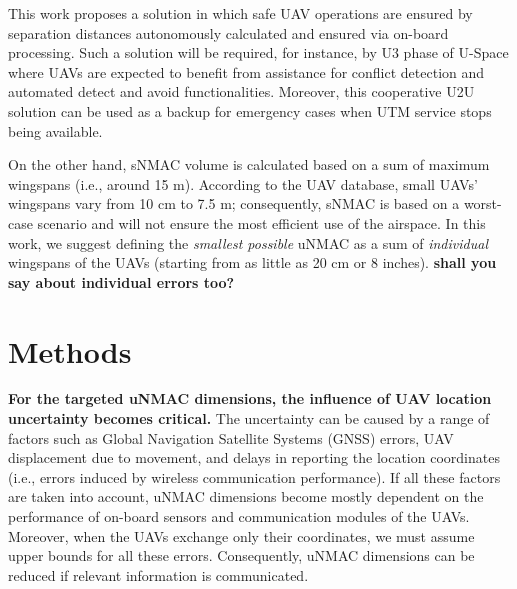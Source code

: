\documentclass[conference]{IEEEtran}
\begin{document}
This work proposes a solution in which safe UAV operations are ensured by separation distances autonomously calculated and ensured via on-board processing. Such a solution will be required, for instance, by U3 phase of U-Space where UAVs are expected to benefit from assistance for conflict detection and automated detect and avoid functionalities. Moreover, this cooperative U2U solution can be used as a backup for emergency cases when UTM service stops being available. 

On the other hand, sNMAC volume \cite{Weinert22} is calculated based on a sum of maximum wingspans (i.e., around 15 m). According to the UAV database, small UAVs' wingspans vary from 10 cm to 7.5 m; consequently, sNMAC is based on a worst-case scenario and will not ensure the most efficient use of the airspace. In this work, we suggest defining the \textit{smallest possible} uNMAC as a sum of \textit{individual} wingspans of the UAVs (starting from as little as 20 cm or 8 inches).  
\textbf{shall you say about individual errors too?}


\section{Methods}
\textbf{For the targeted uNMAC dimensions, the influence of UAV location uncertainty becomes critical.} 
The uncertainty can be caused by a range of factors such as Global Navigation Satellite Systems (GNSS) errors, UAV displacement due to movement, and delays in reporting the location coordinates (i.e., errors induced by wireless communication performance). If all these factors are taken into account, uNMAC dimensions become mostly dependent on the performance of on-board sensors and communication modules of the UAVs. Moreover, when the UAVs exchange only their coordinates, we must assume upper bounds for all these errors. 
Consequently, uNMAC dimensions can be reduced if relevant information is communicated.
\end{document}

